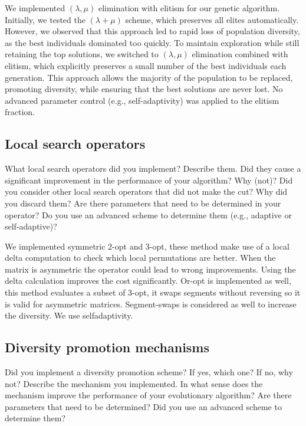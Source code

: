 \documentclass[a4paper,10pt]{article}
\newcommand{\ReplaceMe}[1]{{\color{blue}#1}}
\begin{document}
\noindent
We implemented $(\lambda, \mu)$ elimination with elitism for our genetic algorithm. Initially, we tested the $(\lambda + \mu)$ scheme, which preserves all elites automatically. However, we observed that this approach led to rapid loss of population diversity, as the best individuals dominated too quickly. To maintain exploration while still retaining the top solutions, we switched to $(\lambda, \mu)$ elimination combined with elitism, which explicitly preserves a small number of the best individuals each generation. This approach allows the majority of the population to be replaced, promoting diversity, while ensuring that the best solutions are never lost. No advanced parameter control (e.g., self-adaptivity) was applied to the elitism fraction.

\subsection{Local search operators}

\ReplaceMe{What local search operators did you implement? Describe them. Did they cause a significant improvement in the performance of your algorithm? Why (not)? Did you consider other local search operators that did not make the cut? Why did you discard them? Are there parameters that need to be determined in your operator? Do you use an advanced scheme to determine them (e.g., adaptive or self-adaptive)?}

We implemented symmetric 2-opt and 3-opt, these method make use of a local delta computation to check which local permutations are better. When the matrix is asymmetric the operator could lead to wrong improvements. Using the delta calculation improves the cost significantly. Or-opt is implemented as well, this method evaluates a subset of 3-opt, it swaps segments without reversing so it is valid for asymmetric matrices. 
Segment-swaps is considered as well to increase the diversity.
We use selfadaptivity.

\subsection{Diversity promotion mechanisms}

\ReplaceMe{Did you implement a diversity promotion scheme? If yes, which one? If no, why not? Describe the mechanism you implemented. In what sense does the mechanism improve the performance of your evolutionary algorithm? Are there parameters that need to be determined? Did you use an advanced scheme to determine them?}
\end{document}
